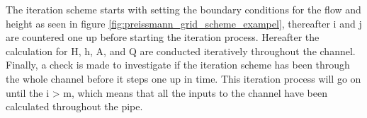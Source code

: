 The iteration scheme starts with setting the boundary conditions for the flow and height as seen in figure \ref{fig:preissmann_grid_scheme_exampel}, thereafter i and j are countered one up before starting the iteration process. Hereafter the calculation for H, h, A, and Q are conducted iteratively throughout the channel. Finally, a check is made to investigate if the iteration scheme has been through the whole channel before it steps one up in time. This iteration process will go on until the i > m, which means that all the inputs to the channel have been calculated throughout the pipe.   



